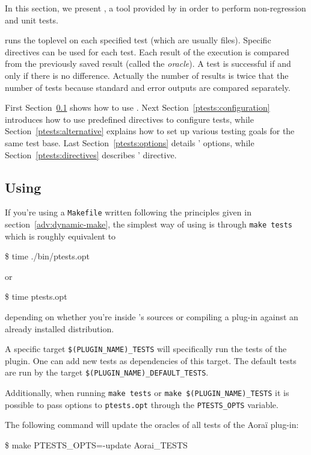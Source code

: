In this section, we present \ptests, a tool provided by \framac in order to
perform non-regression and unit tests.

\ptests{} runs the \framac toplevel on each specified test
(which are usually \C files). Specific directives can be used for each
test. Each result of the execution is compared from the previously saved result
(called the \emph{oracle}). A test is successful if and only
if there is no difference.  Actually the number of results is twice that the
number of tests because standard and error outputs are compared separately.

First Section~\ref{ptests:use} shows how to use \ptests. Next
Section~\ref{ptests:configuration} introduces how to use predefined directives
to configure tests, while Section~\ref{ptests:alternative} explains
how to set up various testing goals for the same test base. Last
Section~\ref{ptests:options} details \ptests' options, while
Section~\ref{ptests:directives} describes \ptests' directive.

\subsection{Using \ptests}\label{ptests:use}

If you're using a \texttt{Makefile} written following the principles given in
section~\ref{adv:dynamic-make}, the simplest way of using \ptests is through 
\texttt{make tests} which is
roughly equivalent to
\begin{shell}
\$ time ./bin/ptests.opt
\end{shell}
or
\begin{shell}
\$ time ptests.opt
\end{shell}
depending on whether you're inside \framac's sources or compiling a plug-in 
against an already installed \framac distribution.

A specific target \texttt{\$(PLUGIN\_NAME)\_TESTS} will specifically run the tests
of the plugin. One can add new tests as dependencies of this target.
The default tests are run by the target \texttt{\$(PLUGIN\_NAME)\_DEFAULT\_TESTS}.

Additionally, when running \texttt{make tests} or
\texttt{make \$(PLUGIN\_NAME)\_TESTS}
it is possible to pass options to \texttt{ptests.opt} through the
\texttt{PTESTS\_OPTS} variable.

\begin{example}
The following command will update the oracles of all tests of the Aoraï plug-in:
\begin{shell}
\$ make PTESTS_OPTS=-update Aorai_TESTS
\end{shell}
\end{example}

